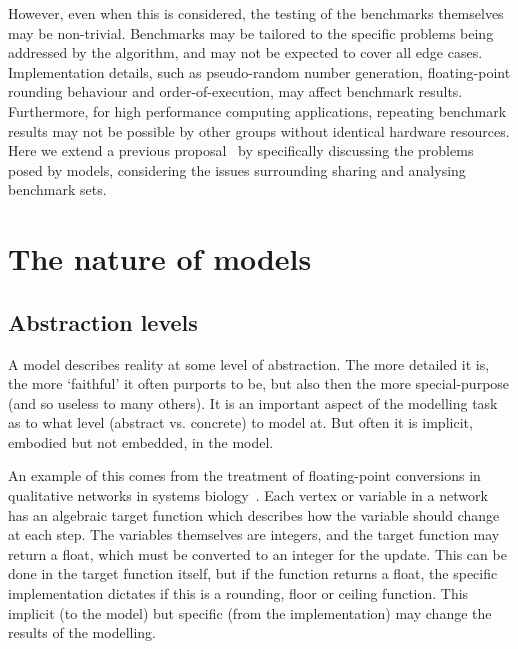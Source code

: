\documentclass[conference]{IEEEtran}
\begin{document}
However, even when this is considered, the testing of the benchmarks
themselves may be non-trivial. Benchmarks may be tailored to the
specific problems being addressed by the algorithm, and may not be
expected to cover all edge cases. Implementation details, such as
pseudo-random number generation, floating-point rounding behaviour and
order-of-execution, may affect benchmark results. Furthermore, for
high performance computing applications, repeating benchmark results
may not be possible by other groups without identical hardware
resources. Here we extend a previous
proposal~\cite{crick-et-al_wssspe2} by specifically discussing the
problems posed by models, considering the issues surrounding sharing
and analysing benchmark sets.


\section{The nature of models}

\subsection{Abstraction levels} 

A model describes reality at some level of abstraction. The more
detailed it is, the more `faithful' it often purports to be, but also
then the more special-purpose (and so useless to many others). It is
an important aspect of the modelling task as to what level (abstract
vs. concrete) to model at. But often it is implicit, embodied but not
embedded, in the model.

An example of this comes from the treatment of floating-point
conversions in qualitative networks in systems
biology~\cite{Schaub2007}. Each vertex or variable in a network has an
algebraic target function which describes how the variable should
change at each step. The variables themselves are integers, and the
target function may return a float, which must be converted to an
integer for the update. This can be done in the target function
itself, but if the function returns a float, the specific
implementation dictates if this is a rounding, floor or ceiling
function. This implicit (to the model) but specific (from the
implementation) may change the results of the modelling.
\end{document}
